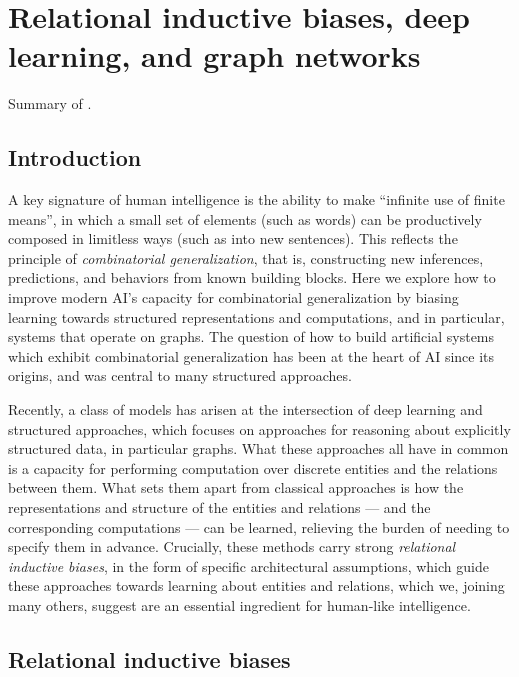\documentclass[10pt]{book}
\let\defaultmarginpar\marginpar
\renewcommand\marginpar[2][]{\defaultmarginpar{\itshape\color{gray}#2}}
\begin{document}
\chapter{Relational inductive biases, deep learning, and graph networks}

Summary of \cite{battaglia2018relational}.

\section{Introduction}

A key signature of human intelligence is the ability to make ``infinite use of finite means'', in which a small set of elements (such as words) can be productively composed in limitless ways (such as into new sentences). This reflects the principle of \emph{combinatorial generalization}\marginpar{combinatorial generalization}, that is, constructing new inferences, predictions, and behaviors from known building blocks. Here we explore how to improve modern AI's capacity for combinatorial generalization by biasing learning towards structured representations and computations, and in particular, systems that operate on graphs. The question of how to build artificial systems which exhibit combinatorial generalization has been at the heart of AI since its origins, and was central to many structured approaches.

Recently, a class of models has arisen at the intersection of deep learning and structured approaches, which focuses on approaches for reasoning about explicitly structured data, in particular graphs. What these approaches all have in common is a capacity for performing computation over discrete entities and the relations between them. What sets them apart from classical approaches is how the representations and structure of the entities and relations --- and the corresponding computations --- can be learned, relieving the burden of needing to specify them in advance. Crucially, these methods carry strong \emph{relational inductive biases}, in the form of specific architectural assumptions, which guide these approaches towards learning about entities and relations, which we, joining many others, suggest are an essential ingredient for human-like intelligence.

\section{Relational inductive biases}
\end{document}
